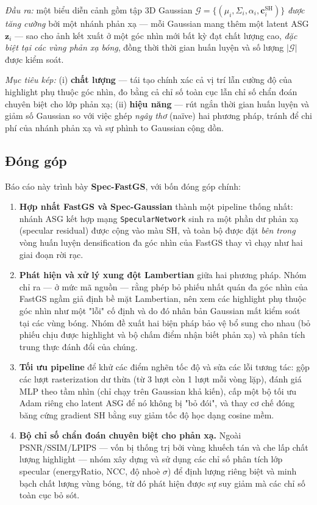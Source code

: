     \textit{Đầu ra:} một biểu diễn cảnh gồm tập 3D Gaussian
    $\mathcal{G} = \{(\mu_i, \Sigma_i, \alpha_i, \mathbf{c}_i^{\text{SH}})\}$
    \textit{được tăng cường} bởi một nhánh phản xạ — mỗi Gaussian mang thêm một
    latent ASG $\mathbf{z}_i$ — sao cho ảnh kết xuất ở một góc nhìn mới bất kỳ đạt
    chất lượng cao, \textit{đặc biệt tại các vùng phản xạ bóng}, đồng thời thời gian
    huấn luyện và số lượng $|\mathcal{G}|$ được kiểm soát.

    \textit{Mục tiêu kép:} (i) \textbf{chất lượng} — tái tạo chính xác cả vị trí lẫn
    cường độ của highlight phụ thuộc góc nhìn, đo bằng cả chỉ số toàn cục lẫn chỉ số
    chẩn đoán chuyên biệt cho lớp phản xạ; (ii) \textbf{hiệu năng} — rút ngắn thời
    gian huấn luyện và giảm số Gaussian so với việc ghép \textit{ngây thơ} (naïve)
    hai phương pháp, tránh để chi phí của nhánh phản xạ và sự phình to Gaussian cộng
    dồn.

    \subsection{Đóng góp}
    Báo cáo này trình bày \textbf{Spec-FastGS}, với bốn đóng góp chính:
    \begin{enumerate}
        \item \textbf{Hợp nhất FastGS và Spec-Gaussian} thành một pipeline thống
        nhất: nhánh ASG kết hợp mạng \texttt{SpecularNetwork} sinh ra một phần dư
        phản xạ (specular residual) được cộng vào màu SH, và toàn bộ được đặt
        \textit{bên trong} vòng huấn luyện densification đa góc nhìn của FastGS thay
        vì chạy như hai giai đoạn rời rạc.

        \item \textbf{Phát hiện và xử lý xung đột Lambertian} giữa hai phương pháp.
        Nhóm chỉ ra — ở mức mã nguồn — rằng phép bỏ phiếu nhất quán đa góc nhìn của
        FastGS ngầm giả định bề mặt Lambertian, nên xem các highlight phụ thuộc góc
        nhìn như một "lỗi" cố định và do đó nhân bản Gaussian mất kiểm soát tại các
        vùng bóng. Nhóm đề xuất hai biện pháp bảo vệ bổ sung cho nhau (bỏ phiếu chịu
        được highlight và bộ chấm điểm nhận biết phản xạ) và phân tích trung thực
        đánh đổi của chúng.

        \item \textbf{Tối ưu pipeline} để khử các điểm nghẽn tốc độ và sửa các lỗi
        tương tác: gộp các lượt rasterization dư thừa (từ 3 lượt còn 1 lượt mỗi vòng
        lặp), đánh giá MLP theo tầm nhìn (chỉ chạy trên Gaussian khả kiến), cấp một
        bộ tối ưu Adam riêng cho latent ASG để nó không bị "bỏ đói", và thay cơ chế
        đóng băng cứng gradient SH bằng suy giảm tốc độ học dạng cosine mềm.

        \item \textbf{Bộ chỉ số chẩn đoán chuyên biệt cho phản xạ.} Ngoài
        PSNR/SSIM/LPIPS — vốn bị thống trị bởi vùng khuếch tán và che lấp chất lượng
        highlight — nhóm xây dựng và sử dụng các chỉ số phân tích lớp specular
        (energyRatio, NCC, độ nhoè $\sigma$) để định lượng riêng biệt và minh bạch
        chất lượng vùng bóng, từ đó phát hiện được sự suy giảm mà các chỉ số toàn
        cục bỏ sót.
    \end{enumerate}

